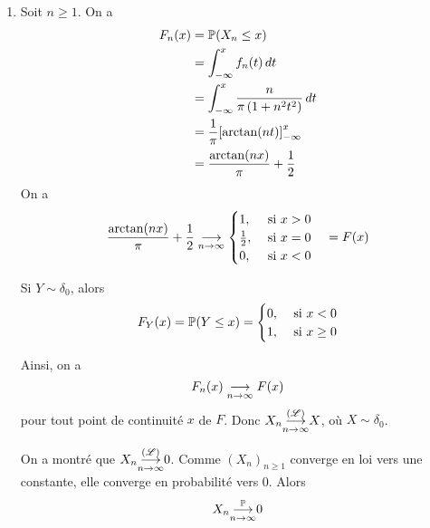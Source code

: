 {\begin{td-sol}
\begin{enumerate}
            \item Soit \(n\geq 1\). On a
            \begin{equation*}
                \begin{aligned}
                    F_n(x)
                    &= \mathbb{P}(X_n\leq x)\\
                    &= \int_{-\infty}^x f_n(t)\mathop{}\!{d} t\\
                    &= \int_{-\infty}^x\frac{n}{\pi\left(1+n^2 t^2\right)}\mathop{}\!{d} t\\
                    &= \frac{1}{\pi}{\left[\arctan(nt)\right]}_{-\infty}^x\\
                    &= \frac{\arctan(nx)}{\pi}+\frac{1}{2}
                \end{aligned}
            \end{equation*}
            On a
            \begin{equation*}
                \frac{\arctan(nx)}{\pi}+\frac{1}{2} \underset{n\to\infty}{\longrightarrow}
                \begin{cases}
                    1,&\text{ si }x>0\\
                    \frac{1}{2},&\text{ si }x=0\\
                    0,&\text{ si }x<0
                \end{cases}\quad =F(x)
            \end{equation*}
            \begin{remark}
                Si \(Y\sim \delta_0\), alors
                \begin{equation*}
                    F_Y(x) = \mathbb{P}(Y\leq x) = \begin{cases}
                        0,&\text{ si }x<0\\
                        1,&\text{ si }x\geq 0
                    \end{cases}
                \end{equation*}
            \end{remark}
            Ainsi, on a
            \begin{equation*}
                F_n(x)\underset{n\to\infty}{\longrightarrow} F(x)
            \end{equation*}
            pour tout point de continuité \(x\) de \(F\).
            Donc \(X_n\underset{n\to\infty}{{\overset{(\mathscr{L})}{\longrightarrow}}} X\), où \(X\sim \delta_0\).

            On a montré que \(X_n\underset{n\to\infty}{{\overset{(\mathscr{L})}{\longrightarrow}}} 0\). Comme \({(X_n)}_{n\geq 1}\)
            converge en loi vers une constante, elle converge en probabilité vers
            0. Alors
            \begin{equation*}
                X_n\underset{n\to\infty}{{\overset{\mathbb{P}}{\longrightarrow}}} 0
            \end{equation*}
        \end{enumerate}
    \end{td-sol}
}{}

